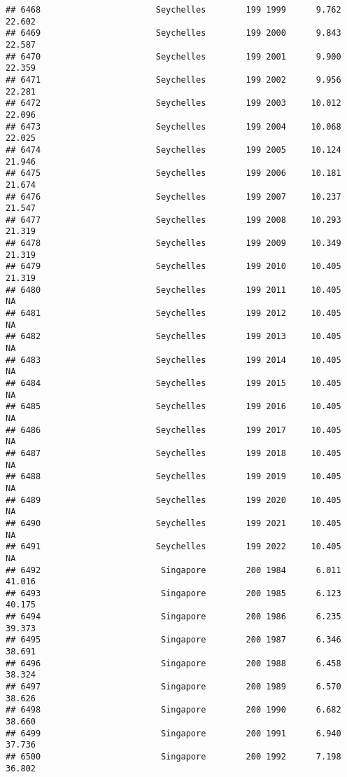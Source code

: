 \documentclass[
]{article}
\begin{document}
\begin{verbatim}
## 6468                       Seychelles        199 1999      9.762     22.602
## 6469                       Seychelles        199 2000      9.843     22.587
## 6470                       Seychelles        199 2001      9.900     22.359
## 6471                       Seychelles        199 2002      9.956     22.281
## 6472                       Seychelles        199 2003     10.012     22.096
## 6473                       Seychelles        199 2004     10.068     22.025
## 6474                       Seychelles        199 2005     10.124     21.946
## 6475                       Seychelles        199 2006     10.181     21.674
## 6476                       Seychelles        199 2007     10.237     21.547
## 6477                       Seychelles        199 2008     10.293     21.319
## 6478                       Seychelles        199 2009     10.349     21.319
## 6479                       Seychelles        199 2010     10.405     21.319
## 6480                       Seychelles        199 2011     10.405         NA
## 6481                       Seychelles        199 2012     10.405         NA
## 6482                       Seychelles        199 2013     10.405         NA
## 6483                       Seychelles        199 2014     10.405         NA
## 6484                       Seychelles        199 2015     10.405         NA
## 6485                       Seychelles        199 2016     10.405         NA
## 6486                       Seychelles        199 2017     10.405         NA
## 6487                       Seychelles        199 2018     10.405         NA
## 6488                       Seychelles        199 2019     10.405         NA
## 6489                       Seychelles        199 2020     10.405         NA
## 6490                       Seychelles        199 2021     10.405         NA
## 6491                       Seychelles        199 2022     10.405         NA
## 6492                        Singapore        200 1984      6.011     41.016
## 6493                        Singapore        200 1985      6.123     40.175
## 6494                        Singapore        200 1986      6.235     39.373
## 6495                        Singapore        200 1987      6.346     38.691
## 6496                        Singapore        200 1988      6.458     38.324
## 6497                        Singapore        200 1989      6.570     38.626
## 6498                        Singapore        200 1990      6.682     38.660
## 6499                        Singapore        200 1991      6.940     37.736
## 6500                        Singapore        200 1992      7.198     36.802

\end{verbatim}
\end{document}
